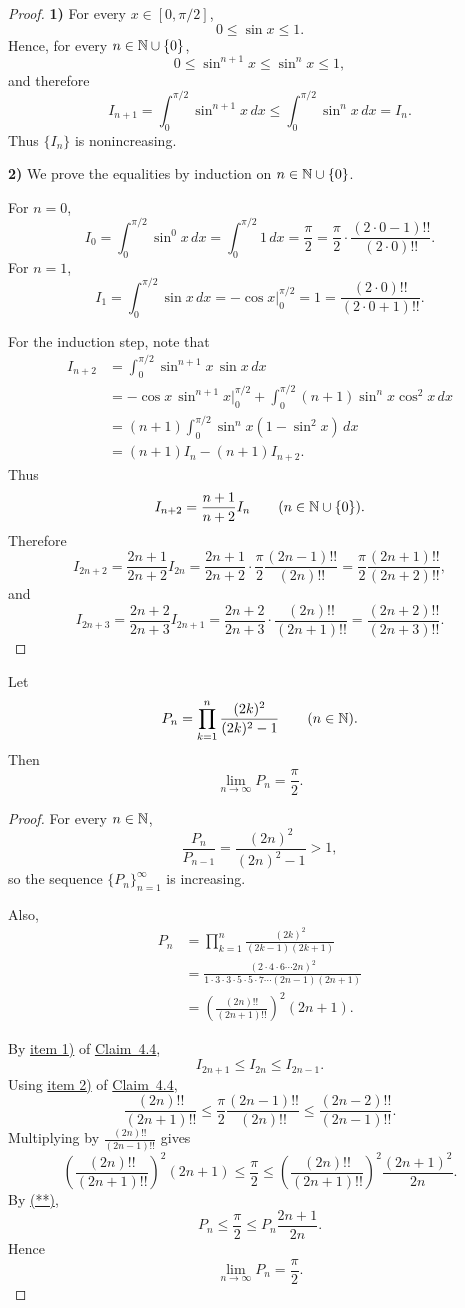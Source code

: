 \begin{proof}
\textbf{1)} For every $x\in[0,\pi/2]$,
\[
0\le\sin x\le1.
\]
Hence, for every $n\in\mathbb{N}\cup\{0\}$,
\[
0\le\sin^{n+1}x\le\sin^n x\le1,
\]
and therefore
\[
I_{n+1}=\int_0^{\pi/2}\sin^{n+1}x\,dx
\le
\int_0^{\pi/2}\sin^n x\,dx=I_n.
\]
Thus $\{I_n\}$ is nonincreasing.

\medskip
\noindent\textbf{2)} We prove the equalities by induction on $n\in\mathbb{N}\cup\{0\}$.

For $n=0$,
\[
I_0=\int_0^{\pi/2}\sin^0x\,dx
=\int_0^{\pi/2}1\,dx
=\frac{\pi}{2}
=\frac{\pi}{2}\cdot\frac{(2\cdot0-1)!!}{(2\cdot0)!!}.
\]
For $n=1$,
\[
I_1=\int_0^{\pi/2}\sin x\,dx
=-\cos x\Big|_0^{\pi/2}
=1
=\frac{(2\cdot0)!!}{(2\cdot0+1)!!}.
\]

For the induction step, note that
\begin{align*}
I_{n+2}
&=\int_0^{\pi/2}\sin^{n+1}x\,\sin x\,dx\\
&=-\cos x\,\sin^{n+1}x\Big|_0^{\pi/2}
+\int_0^{\pi/2}(n+1)\sin^n x\cos^2x\,dx\\
&=(n+1)\int_0^{\pi/2}\sin^n x(1-\sin^2x)\,dx\\
&=(n+1)I_n-(n+1)I_{n+2}.
\end{align*}
Thus
\[
I_{n+2}=\frac{n+1}{n+2}I_n
\qquad(n\in\mathbb{N}\cup\{0\}).
\]
Therefore
\[
I_{2n+2}=\frac{2n+1}{2n+2}I_{2n}
=\frac{2n+1}{2n+2}\cdot\frac{\pi}{2}\frac{(2n-1)!!}{(2n)!!}
=\frac{\pi}{2}\frac{(2n+1)!!}{(2n+2)!!},
\]
and
\[
I_{2n+3}=\frac{2n+2}{2n+3}I_{2n+1}
=\frac{2n+2}{2n+3}\cdot\frac{(2n)!!}{(2n+1)!!}
=\frac{(2n+2)!!}{(2n+3)!!}.
\]
\end{proof}

\begin{claim}\label{claim:4.5}
Let
\[
P_n=\prod_{k=1}^{n}\frac{(2k)^2}{(2k)^2-1}
\qquad(n\in\mathbb{N}).
\]
Then
\[
\lim_{n\to\infty}P_n=\frac{\pi}{2}.
\]
\end{claim}

\begin{proof}
For every $n\in\mathbb{N}$,
\[
\frac{P_n}{P_{n-1}}=\frac{(2n)^2}{(2n)^2-1}>1,
\]
so the sequence $\{P_n\}_{n=1}^{\infty}$ is increasing.

Also,
\begin{align*}
P_n
&=\prod_{k=1}^{n}\frac{(2k)^2}{(2k-1)(2k+1)}\\
&=\frac{(2\cdot4\cdot6\cdots2n)^2}
{1\cdot3\cdot3\cdot5\cdot5\cdot7\cdots(2n-1)(2n+1)}\\
&=\left(\frac{(2n)!!}{(2n+1)!!}\right)^2(2n+1).
\tag{**}\label{eq:4:starstar:1}
\end{align*}

By \hyperref[item:claim:4.4:1]{item 1)} of \hyperref[claim:4.4]{Claim~4.4},
\[
I_{2n+1}\le I_{2n}\le I_{2n-1}.
\]
Using \hyperref[item:claim:4.4:2]{item 2)} of \hyperref[claim:4.4]{Claim~4.4},
\[
\frac{(2n)!!}{(2n+1)!!}
\le
\frac{\pi}{2}\frac{(2n-1)!!}{(2n)!!}
\le
\frac{(2n-2)!!}{(2n-1)!!}.
\]
Multiplying by $\frac{(2n)!!}{(2n-1)!!}$ gives
\[
\left(\frac{(2n)!!}{(2n+1)!!}\right)^2(2n+1)
\le\frac{\pi}{2}
\le
\left(\frac{(2n)!!}{(2n+1)!!}\right)^2\frac{(2n+1)^2}{2n}.
\]
By \hyperref[eq:4:starstar:1]{(**)},
\[
P_n\le\frac{\pi}{2}\le P_n\frac{2n+1}{2n}.
\]
Hence
\[
\lim_{n\to\infty}P_n=\frac{\pi}{2}.
\]
\end{proof}

